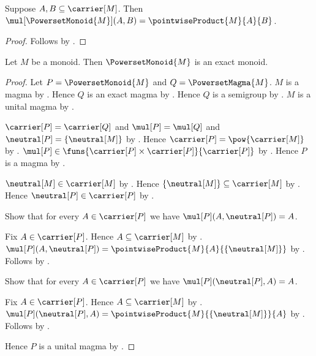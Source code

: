 \begin{proposition}\label{powerset_monoid_mul_apply}
    Suppose $A,B\subseteq\carrier[M]$.
    Then $\mul[\PowersetMonoid{M}](A,B)
        =\pointwiseProduct{M}{A}{B}$.
\end{proposition}
\begin{proof}
    Follows by
        .
\end{proof}

\begin{theorem}\label{powerset_monoid_is_exact}
    Let $M$ be a monoid.
    Then $\PowersetMonoid{M}$ is an exact monoid.
\end{theorem}
\begin{proof}
    Let $P=\PowersetMonoid{M}$ and $Q=\PowersetMagma{M}$.
    $M$ is a magma by .
    Hence $Q$ is an exact magma by .
    Hence $Q$ is a semigroup by .
    $M$ is a unital magma by .

    $\carrier[P]=\carrier[Q]$ and $\mul[P]=\mul[Q]$ and
        $\neutral[P]=\{\neutral[M]\}$ by
        .
    Hence $\carrier[P]=\pow{\carrier[M]}$ by
        .
    $\mul[P]\in\funs{\carrier[P]\times\carrier[P]}{\carrier[P]}$ by
        .
    Hence $P$ is a magma by
        .

    $\neutral[M]\in\carrier[M]$ by .
    Hence $\{\neutral[M]\}\subseteq\carrier[M]$ by
        .
    Hence $\neutral[P]\in\carrier[P]$ by
        .

    Show that for every $A\in\carrier[P]$ we have
        $\mul[P](A,\neutral[P])=A$.
    \begin{subproof}
        Fix $A\in\carrier[P]$.
        Hence $A\subseteq\carrier[M]$ by
            .
        $\mul[P](A,\neutral[P])
            =\pointwiseProduct{M}{A}{\{\neutral[M]\}}$ by
            .
        Follows by .
    \end{subproof}

    Show that for every $A\in\carrier[P]$ we have
        $\mul[P](\neutral[P],A)=A$.
    \begin{subproof}
        Fix $A\in\carrier[P]$.
        Hence $A\subseteq\carrier[M]$ by
            .
        $\mul[P](\neutral[P],A)
            =\pointwiseProduct{M}{\{\neutral[M]\}}{A}$ by
            .
        Follows by .
    \end{subproof}
    Hence $P$ is a unital magma by
        .


\end{proof}
